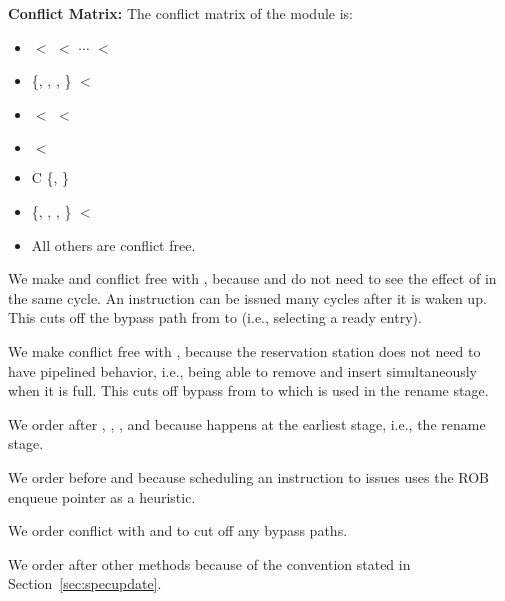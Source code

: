 \noindent\textbf{Conflict Matrix:}
The conflict matrix of the module is:
\begin{itemize}
    \item {} $<$  $<$ $\cdots$ $<$ 
    \item \{, , , \} $<$ 
    \item {} $<$  $<$ 
    \item {} $<$ 
    \item {} C \{, \}
    \item \{, , , \} $<$ 
    \item All others are conflict free.
\end{itemize}

We make  and  conflict free with , because  and  do not need to see the effect of  in the same cycle.
An instruction can be issued many cycles after it is waken up.
This cuts off the bypass path from  to  (i.e., selecting a ready entry).

We make  conflict free with , because the reservation station does not need to have pipelined behavior, i.e., being able to remove and insert simultaneously when it is full.
This cuts off bypass from  to  which is used in the rename stage.

We order  after , , , and  because  happens at the earliest stage, i.e., the rename stage.

We order  before  and  because scheduling an instruction to issues uses the ROB enqueue pointer as a heuristic.

We order  conflict with  and  to cut off any bypass paths.

We order  after other methods because of the convention stated in Section~\ref{sec:specupdate}.

